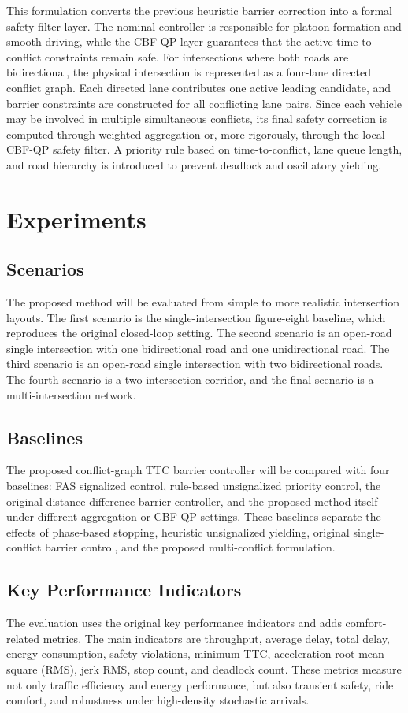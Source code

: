\documentclass[conference]{IEEEtran}
\begin{document}
This formulation converts the previous heuristic barrier correction into a formal safety-filter layer. The nominal controller is responsible for platoon formation and smooth driving, while the CBF-QP layer guarantees that the active time-to-conflict constraints remain safe. For intersections where both roads are bidirectional, the physical intersection is represented as a four-lane directed conflict graph. Each directed lane contributes one active leading candidate, and barrier constraints are constructed for all conflicting lane pairs. Since each vehicle may be involved in multiple simultaneous conflicts, its final safety correction is computed through weighted aggregation or, more rigorously, through the local CBF-QP safety filter. A priority rule based on time-to-conflict, lane queue length, and road hierarchy is introduced to prevent deadlock and oscillatory yielding.

\section{Experiments}

\subsection{Scenarios}
The proposed method will be evaluated from simple to more realistic intersection layouts. The first scenario is the single-intersection figure-eight baseline, which reproduces the original closed-loop setting. The second scenario is an open-road single intersection with one bidirectional road and one unidirectional road. The third scenario is an open-road single intersection with two bidirectional roads. The fourth scenario is a two-intersection corridor, and the final scenario is a multi-intersection network.

\subsection{Baselines}
The proposed conflict-graph TTC barrier controller will be compared with four baselines: FAS signalized control, rule-based unsignalized priority control, the original distance-difference barrier controller, and the proposed method itself under different aggregation or CBF-QP settings. These baselines separate the effects of phase-based stopping, heuristic unsignalized yielding, original single-conflict barrier control, and the proposed multi-conflict formulation.

\subsection{Key Performance Indicators}
The evaluation uses the original key performance indicators and adds comfort-related metrics. The main indicators are throughput, average delay, total delay, energy consumption, safety violations, minimum TTC, acceleration root mean square (RMS), jerk RMS, stop count, and deadlock count. These metrics measure not only traffic efficiency and energy performance, but also transient safety, ride comfort, and robustness under high-density stochastic arrivals.
\end{document}
